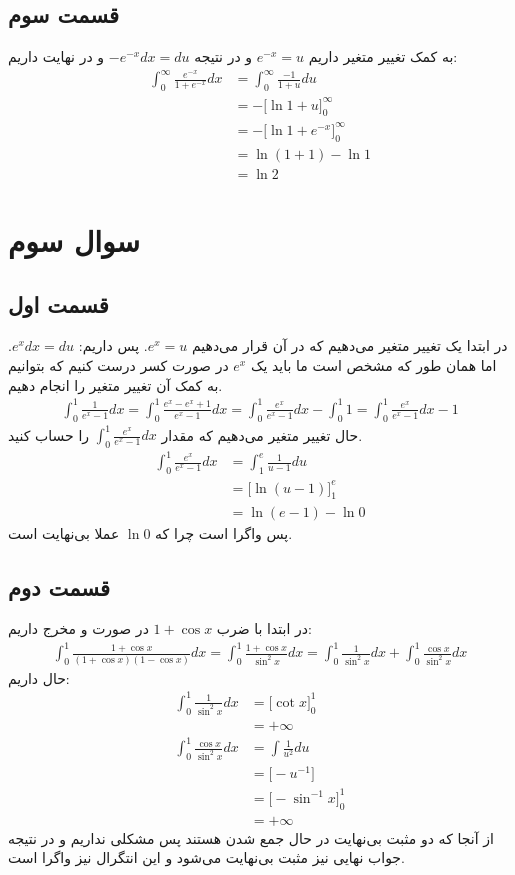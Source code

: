 \documentclass[]{article}
\begin{document}
\subsection*{قسمت سوم}
به کمک تغییر متغیر داریم
$e^{-x} = u$
و در نتیجه
$-e^{-x} dx = du$
و در نهایت داریم:
\begin{align*}
    \int_{0}^{\infty} \frac{e^{-x}}{1+e^{-x}} dx &= \int_{0}^{\infty} \frac{-1}{1+u} du\\
    &= -\Big[\ln 1 + u\Big]_{0}^{\infty}\\
    &= -\Big[\ln 1 + e^{-x}\Big]_{0}^{\infty}\\
    &= \ln (1 + 1) - \ln 1\\
    &= \boxed{\ln 2}
\end{align*}
\section*{سوال سوم}
\subsection*{قسمت اول}
در ابتدا یک تغییر متغیر می‌دهیم که در آن قرار می‌دهیم
$e^x = u$.
پس داریم:
$e^x dx = du$.
اما همان طور که مشخص است ما باید یک
$e^x$
در صورت کسر درست کنیم که بتوانیم به کمک آن تغییر متغیر را انجام دهیم.
\begin{gather*}
    \int_{0}^{1} \frac{1}{e^x - 1} dx = \int_{0}^{1} \frac{e^x - e^x + 1}{e^x - 1} dx = \int_{0}^{1} \frac{e^x}{e^x - 1} dx - \int_{0}^{1} 1 = \int_{0}^{1} \frac{e^x}{e^x - 1} dx - 1
\end{gather*}
حال تغییر متغیر می‌دهیم که مقدار
$\int_{0}^{1} \frac{e^x}{e^x - 1} dx$
را حساب کنید.
\begin{align*}
    \int_{0}^{1} \frac{e^x}{e^x - 1} dx &= \int_{1}^{e} \frac{1}{u - 1} du\\
    &= \big[\ln(u-1)\big]_1^e\\
    &= \ln(e - 1) - \ln0
\end{align*}
پس واگرا است چرا که
$\ln0$
عملا بی‌نهایت است.
\subsection*{قسمت دوم}
در ابتدا با ضرب
$1 + \cos x$
در صورت و مخرج داریم:
\begin{gather*}
    \int_0^1\frac{1+\cos x}{(1+\cos x)(1-\cos x)}dx = \int_0^1\frac{1+\cos x}{\sin^2 x}dx = \int_0^1\frac{1}{\sin^2 x}dx + \int_0^1 \frac{\cos x}{\sin^2 x}dx
\end{gather*}
حال داریم:
\begin{align*}
    \int_0^1\frac{1}{\sin^2 x}dx &= \big[\cot x\big]_0^1\\
    &= +\infty\\
    \int_0^1\frac{\cos x}{\sin^2 x}dx &= \int \frac{1}{u^2} du\\
    &= \big[-u^{-1}\big]\\
    &= \big[-\sin^{-1}x\big]_0^1\\
    &= +\infty
\end{align*}
از آنجا که دو مثبت بی‌نهایت در حال جمع شدن هستند پس مشکلی نداریم و در نتیجه جواب نهایی نیز
مثبت بی‌نهایت می‌شود و این انتگرال نیز واگرا است.
\end{document}
